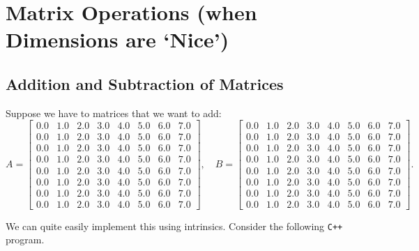 \documentclass[10pt]{article}
\theoremstyle{definition}
\theoremstyle{plain}
\begin{document}
\pagebreak



\section{Matrix Operations (when Dimensions are `Nice')}
\subsection{Addition and Subtraction of Matrices}
Suppose we have to matrices that we want to add:
\[
A =
\begin{bmatrix}
    0.0 & 1.0 & 2.0 & 3.0 & 4.0 & 5.0 & 6.0 & 7.0 \\
    0.0 & 1.0 & 2.0 & 3.0 & 4.0 & 5.0 & 6.0 & 7.0 \\
    0.0 & 1.0 & 2.0 & 3.0 & 4.0 & 5.0 & 6.0 & 7.0 \\
    0.0 & 1.0 & 2.0 & 3.0 & 4.0 & 5.0 & 6.0 & 7.0 \\
    0.0 & 1.0 & 2.0 & 3.0 & 4.0 & 5.0 & 6.0 & 7.0 \\
    0.0 & 1.0 & 2.0 & 3.0 & 4.0 & 5.0 & 6.0 & 7.0 \\
    0.0 & 1.0 & 2.0 & 3.0 & 4.0 & 5.0 & 6.0 & 7.0 \\
    0.0 & 1.0 & 2.0 & 3.0 & 4.0 & 5.0 & 6.0 & 7.0
\end{bmatrix}, \quad
B =
\begin{bmatrix}
    0.0 & 1.0 & 2.0 & 3.0 & 4.0 & 5.0 & 6.0 & 7.0 \\
    0.0 & 1.0 & 2.0 & 3.0 & 4.0 & 5.0 & 6.0 & 7.0 \\
    0.0 & 1.0 & 2.0 & 3.0 & 4.0 & 5.0 & 6.0 & 7.0 \\
    0.0 & 1.0 & 2.0 & 3.0 & 4.0 & 5.0 & 6.0 & 7.0 \\
    0.0 & 1.0 & 2.0 & 3.0 & 4.0 & 5.0 & 6.0 & 7.0 \\
    0.0 & 1.0 & 2.0 & 3.0 & 4.0 & 5.0 & 6.0 & 7.0 \\
    0.0 & 1.0 & 2.0 & 3.0 & 4.0 & 5.0 & 6.0 & 7.0 \\
    0.0 & 1.0 & 2.0 & 3.0 & 4.0 & 5.0 & 6.0 & 7.0
\end{bmatrix}.
\]

\noindent We can quite easily implement this using intrinsics. Consider the following \texttt{C++} program.

\inputminted[tabsize=2,breaklines,linenos]{c++}{source/mat_add.cpp}
\end{document}
